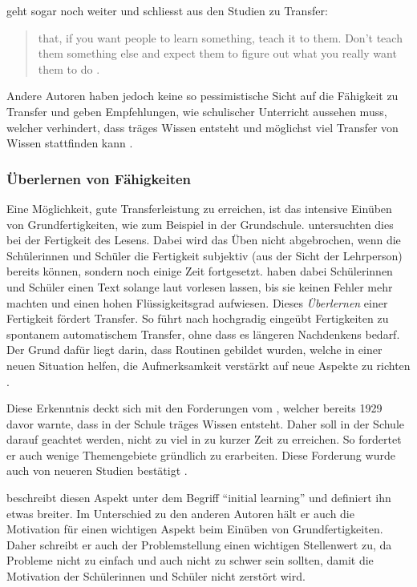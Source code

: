 \citeauthor{Detterman1993} geht sogar noch weiter und schliesst aus den Studien zu Transfer:
\begin{quote}
that, if you want people to learn something, teach it to them. Don't teach them something else and expect them to figure out what you really want them to do \citep[S. 21]{Detterman1993}.
\end{quote}

Andere Autoren haben jedoch keine so pessimistische Sicht auf die Fähigkeit zu Transfer und geben Empfehlungen, wie schulischer Unterricht aussehen muss, welcher verhindert, dass träges Wissen entsteht und möglichst viel Transfer von Wissen stattfinden kann \citep[Kapitel 3]{Bransford2000}.


\subsubsection{Überlernen von Fähigkeiten}
Eine Möglichkeit, gute Transferleistung zu erreichen, ist das intensive Einüben von Grundfertigkeiten, wie zum Beispiel in der Grundschule. \citet{LaBerge1974} untersuchten dies bei der Fertigkeit des Lesens. Dabei wird das Üben nicht abgebrochen, wenn die Schülerinnen und Schüler die Fertigkeit subjektiv (aus der Sicht der Lehrperson) bereits können, sondern noch einige Zeit fortgesetzt. \citeauthor{LaBerge1974} haben dabei Schülerinnen und Schüler einen Text solange laut vorlesen lassen, bis sie keinen Fehler mehr machten und einen hohen Flüssigkeitsgrad aufwiesen. Dieses \textit{Überlernen} einer Fertigkeit fördert Transfer. So führt nach \citet{Perkins1989} hochgradig eingeübt Fertigkeiten zu spontanem automatischem Transfer, ohne dass es längeren Nachdenkens bedarf. Der Grund dafür liegt darin, dass Routinen gebildet wurden, welche in einer neuen Situation helfen, die Aufmerksamkeit verstärkt auf neue Aspekte zu richten \citep{LaBerge1974, Mietzel2007}.

Diese Erkenntnis deckt sich mit den Forderungen vom \citet{Whitehead1929}, welcher bereits 1929 davor warnte, dass in der Schule träges Wissen entsteht. Daher soll in der Schule darauf geachtet werden, nicht zu viel in zu kurzer Zeit zu erreichen. So fordertet er auch wenige Themengebiete gründlich zu erarbeiten. Diese Forderung wurde auch von neueren Studien bestätigt \citep{Porter1989,Brophy1992a,Millar1999}. 

\citet{Bransford2000} beschreibt diesen Aspekt unter dem Begriff "`initial learning"' und definiert ihn etwas breiter.  Im Unterschied zu den anderen Autoren hält er auch die Motivation für einen wichtigen Aspekt beim Einüben von Grundfertigkeiten. Daher schreibt er auch der Problemstellung einen wichtigen Stellenwert zu, da Probleme nicht zu einfach und auch nicht zu schwer sein sollten, damit die Motivation der Schülerinnen und Schüler nicht zerstört wird.

